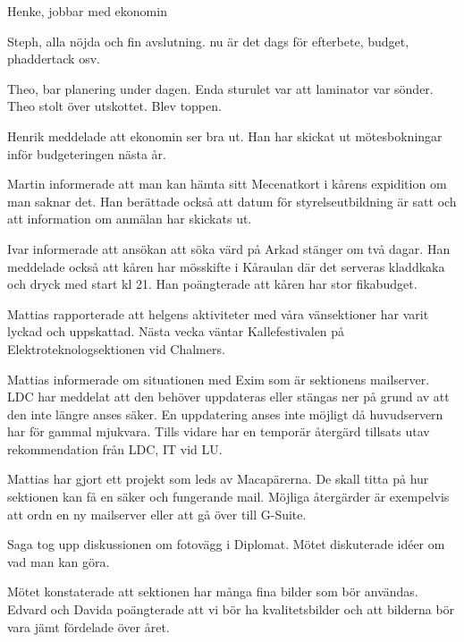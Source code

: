 \documentclass[10pt]{article}
\begin{document}
\begin{paragrafer}
\begin{paragrafer}
Henke, jobbar med ekonomin

Steph, alla nöjda och fin avslutning. nu är det dags för efterbete, budget, phaddertack osv. 

Theo, bar planering under dagen. Enda sturulet var att laminator var sönder. Theo stolt över utskottet. Blev toppen. 

Henrik meddelade att ekonomin ser bra ut. Han har skickat ut mötesbokningar inför budgeteringen nästa år.


Martin informerade att man kan hämta sitt Mecenatkort i kårens expidition om man saknar det.
Han berättade också att datum för styrelseutbildning är satt och att information om anmälan har skickats ut. 

Ivar informerade att ansökan att söka värd på Arkad stänger om två dagar. 
Han meddelade också att kåren har mösskifte i Kåraulan där det serveras kladdkaka och dryck med start kl 21. Han poängterade att kåren har stor fikabudget. 


Mattias rapporterade att helgens aktiviteter med våra vänsektioner har varit lyckad och uppskattad. Nästa vecka väntar Kallefestivalen på Elektroteknologsektionen vid Chalmers. 

\end{paragrafer}


Mattias informerade om situationen med Exim som är sektionens mailserver. 
LDC har meddelat att den behöver uppdateras eller stängas ner på grund av att den inte längre anses säker. En uppdatering anses inte möjligt då huvudservern har för gammal mjukvara. Tills vidare har en temporär återgärd tillsats utav rekommendation från LDC, IT vid LU. 

Mattias har gjort ett projekt som leds av Macapärerna. De skall titta på hur sektionen kan få en säker och fungerande mail. Möjliga återgärder är exempelvis att ordn en ny mailserver eller att gå över till G-Suite.


Saga tog upp diskussionen om fotovägg i Diplomat. Mötet diskuterade idéer om vad man kan göra. 

Mötet konstaterade att sektionen har många fina bilder som bör användas. Edvard och Davida poängterade att vi bör ha kvalitetsbilder och att bilderna bör vara jämt fördelade över året. 


\end{paragrafer}
\end{document}
